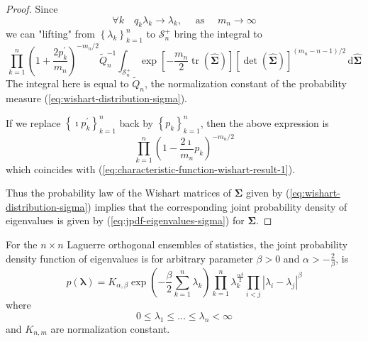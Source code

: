 \begin{proof}
    Since
    \begin{equation*}
        \forall k\quad q_{k}\lambda_{k}\rightarrow\lambda_{k},\quad\text{ as }\quad m_{n}\rightarrow\infty
    \end{equation*}
    we can "lifting" from $\left\{\lambda_{k}\right\}_{k=1}^{n}$ to $\mathcal{S}_{n}^{+}$ bring the integral to
    \begin{equation*}
        \prod_{k=1}^{n}\left(1+\frac{2p_{k}^{\prime}}{m_{n}}\right)^{-m_{n}/2}\widetilde{Q}_{n}^{-1}\int_{\mathcal{S}_{n}^{+}}\exp\left[-\frac{m_{n}}{2}\operatorname{tr}\left(\widehat{\boldsymbol{\Sigma}}\right)\right]\left[\operatorname{det}\left(\widehat{\boldsymbol{\Sigma}}\right)\right]^{(m_{n}-n-1)/2}\,\mathrm{d}\widehat{\boldsymbol{\Sigma}}
    \end{equation*}
    The integral here is equal to $\widetilde{Q}_{n}$, the normalization constant of the probability measure (\ref{eq:wishart-distribution-sigma}).

    If we replace $\left\{\imath p_{k}^{\prime}\right\}_{k=1}^{n}$ back by $\left\{p_{k}\right\}_{k=1}^{n}$, then the above expression is
    \begin{equation*}
        \prod_{k=1}^{n}\left(1-\frac{2\imath}{m_n}p_{k}\right)^{-m_{n}/2}
    \end{equation*}
    which coincides with (\ref{eq:characteristic-function-wishart-result-1}).

    Thus the probability law of the Wishart matrices of $\boldsymbol{\Sigma}$ given by (\ref{eq:wishart-distribution-sigma}) implies that the corresponding joint probability density of eigenvalues is given by (\ref{eq:jpdf-eigenvalues-sigma}) for $\boldsymbol{\Sigma}$.
\end{proof}

\begin{definition}
    For the $n\times n$ Laguerre orthogonal ensembles of statistics, the joint probability density function of eigenvalues is
    for arbitrary parameter $\beta>0$ and $\alpha>-\frac{2}{\beta}$, is
    \begin{equation}
        p\left(\boldsymbol{\lambda}\right)=K_{\alpha,\beta}\exp\left(-\frac{\beta}{2}\sum_{k=1}^{n}\lambda_{k}\right)\prod_{k=1}^{n} \lambda_{k}^{\frac{\alpha\beta}{2}}\prod_{i<j}\left|\lambda_{i}-\lambda_{j}\right|^{\beta}
        \label{eq:laguerre-orthogonal-ensemble}
    \end{equation}
    where
    \begin{equation*}
        0\leq\lambda_{1}\leq\ldots\leq\lambda_{n}<\infty
    \end{equation*}
    and $K_{n,m}$ are normalization constant.
\end{definition}

